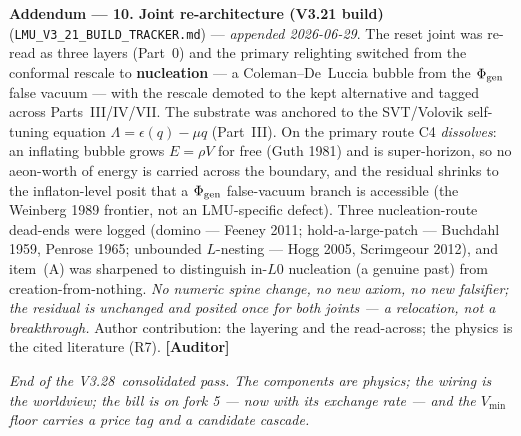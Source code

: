 \documentclass[11pt]{article}
\newcommand{\lmuver}{3.28}
\newcommand{\Auditor}{\textbf{\textcolor{teal!55!black}{[Auditor]}}}
\begin{document}
\smallskip\noindent\textbf{Addendum --- 10. Joint re-architecture (V3.21 build)} (\texttt{LMU\_V3\_21\_BUILD\_TRACKER.md}) --- \emph{appended 2026-06-29}. The reset joint was re-read as three layers (Part~0) and the primary relighting switched from the conformal rescale to \textbf{nucleation} --- a Coleman--De~Luccia bubble from the $\Phi_{\rm gen}$ false vacuum --- with the rescale demoted to the kept alternative and tagged across Parts~III/IV/VII. The substrate was anchored to the SVT/Volovik self-tuning equation $\Lambda=\epsilon(q)-\mu q$ (Part~III). On the primary route C4 \emph{dissolves}: an inflating bubble grows $E=\rho V$ for free (Guth 1981) and is super-horizon, so no aeon-worth of energy is carried across the boundary, and the residual shrinks to the inflaton-level posit that a $\Phi_{\rm gen}$ false-vacuum branch is accessible (the Weinberg 1989 frontier, not an LMU-specific defect). Three nucleation-route dead-ends were logged (domino --- Feeney 2011; hold-a-large-patch --- Buchdahl 1959, Penrose 1965; unbounded $L$-nesting --- Hogg 2005, Scrimgeour 2012), and item~(A) was sharpened to distinguish in-$L0$ nucleation (a genuine past) from creation-from-nothing. \emph{No numeric spine change, no new axiom, no new falsifier; the residual is unchanged and posited once for both joints --- a relocation, not a breakthrough.} Author contribution: the layering and the read-across; the physics is the cited literature (R7). \Auditor

\vspace{6pt}\centering\small\textit{End of the V\lmuver\ consolidated pass. The components are physics; the wiring is the worldview; the bill is on fork 5 --- now with its exchange rate --- and the $V_{\min}$ floor carries a price tag and a candidate cascade.}
\end{document}
